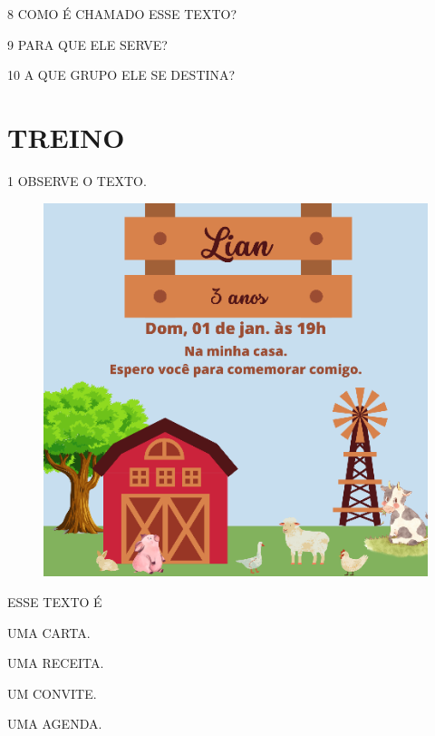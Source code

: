 
\num{8} COMO É CHAMADO ESSE TEXTO?



\num{9} PARA QUE ELE SERVE?


\num{10} A QUE GRUPO ELE SE DESTINA?


\pagebreak
\section{TREINO}


\num{1} OBSERVE O TEXTO.

\begin{figure}[htpb!]
\centering
\includegraphics[width=.9\textwidth]{media/image157.png}
\end{figure}

ESSE TEXTO É

\begin{escolha}
\item UMA CARTA.

\item UMA RECEITA.

\item UM CONVITE.

\item UMA AGENDA.
\end{escolha}

